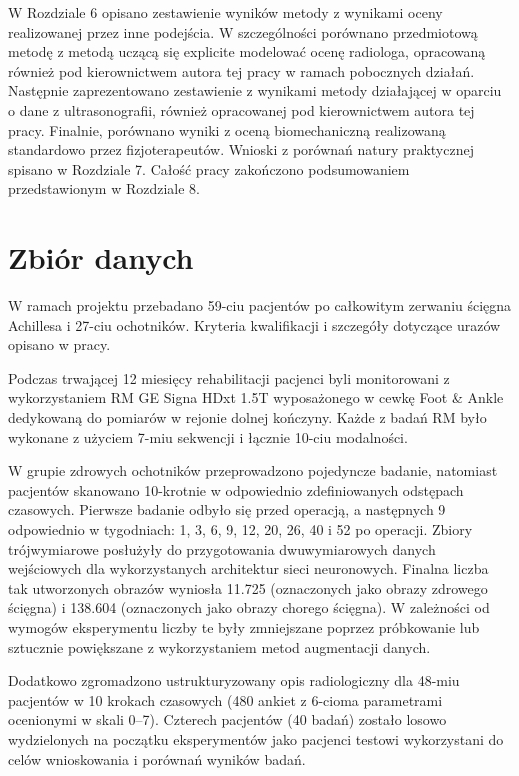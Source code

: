 W Rozdziale 6 opisano zestawienie wyników metody z wynikami oceny realizowanej przez inne podejścia. W szczególności porównano przedmiotową metodę z metodą uczącą się explicite modelować ocenę radiologa, opracowaną również pod kierownictwem autora tej pracy w ramach pobocznych działań. Następnie zaprezentowano zestawienie z wynikami metody działającej w oparciu o dane z ultrasonografii, również opracowanej pod kierownictwem autora tej pracy. Finalnie, porównano wyniki z oceną biomechaniczną realizowaną standardowo przez fizjoterapeutów. Wnioski z porównań natury praktycznej spisano w Rozdziale 7. Całość pracy zakończono podsumowaniem przedstawionym w Rozdziale 8.

\chapter{Zbiór danych}

W ramach projektu przebadano 59-ciu pacjentów po całkowitym zerwaniu ścięgna Achillesa i 27-ciu ochotników. Kryteria kwalifikacji i szczegóły dotyczące urazów opisano w pracy.

Podczas trwającej 12 miesięcy rehabilitacji pacjenci byli monitorowani z wykorzystaniem RM GE Signa HDxt 1.5T wyposażonego w cewkę Foot \& Ankle dedykowaną do pomiarów w rejonie dolnej kończyny. Każde z badań RM było wykonane z użyciem 7-miu sekwencji i łącznie 10-ciu modalności.

W grupie zdrowych ochotników przeprowadzono pojedyncze badanie, natomiast pacjentów skanowano 10-krotnie w odpowiednio zdefiniowanych odstępach czasowych. Pierwsze badanie odbyło się przed operacją, a następnych 9 odpowiednio w tygodniach: 1, 3, 6, 9, 12, 20, 26, 40 i 52 po operacji. Zbiory trójwymiarowe posłużyły do przygotowania dwuwymiarowych danych wejściowych dla wykorzystanych architektur sieci neuronowych. Finalna liczba tak utworzonych obrazów wyniosła 11.725 (oznaczonych jako obrazy zdrowego ścięgna) i 138.604 (oznaczonych jako obrazy chorego ścięgna). W zależności od wymogów eksperymentu liczby te były zmniejszane poprzez próbkowanie lub sztucznie powiększane z wykorzystaniem metod augmentacji danych.

Dodatkowo zgromadzono ustrukturyzowany opis radiologiczny dla 48-miu pacjentów w 10 krokach czasowych (480 ankiet z 6-cioma parametrami ocenionymi w skali 0--7). Czterech pacjentów (40 badań) zostało losowo wydzielonych na początku eksperymentów jako pacjenci testowi wykorzystani do celów wnioskowania i porównań wyników badań.

